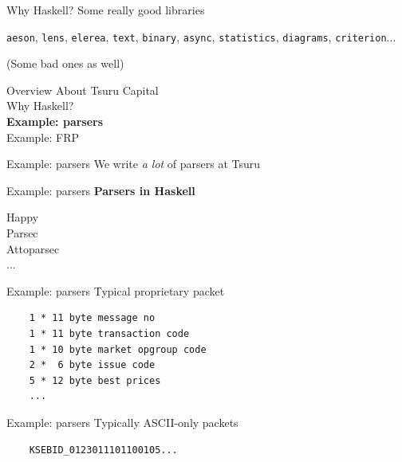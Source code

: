 \documentclass[20pt]{beamer}
\newcommand{\vspaced}{
    \vspace{5mm}
}
\begin{document}
\begin{frame}{Why Haskell?}
    Some really good libraries \\
    \vspaced
    \texttt{aeson}, \texttt{lens}, \texttt{elerea}, \texttt{text},
    \texttt{binary}, \texttt{async}, \texttt{statistics},
    \texttt{diagrams}, \texttt{criterion}...  \\
    \vspaced
    \small{(Some bad ones as well)}
\end{frame}


\begin{frame}{Overview}
    About Tsuru Capital \\
    Why Haskell? \\
    \textbf{Example: parsers} \\
    Example: FRP \\
\end{frame}

\begin{frame}{Example: parsers}
    We write \emph{a lot} of parsers at Tsuru
\end{frame}

\begin{frame}{Example: parsers}
    \textbf{Parsers in Haskell} \\
    \vspaced
    Happy \\
    Parsec \\
    Attoparsec \\
    ... \\
\end{frame}

\begin{frame}[fragile]{Example: parsers}
    Typical proprietary packet \\
    \vspaced
    \begin{lstlisting}
    1 * 11 byte message no
    1 * 11 byte transaction code
    1 * 10 byte market opgroup code
    2 *  6 byte issue code
    5 * 12 byte best prices
    ...
    \end{lstlisting}
\end{frame}

\begin{frame}[fragile]{Example: parsers}
    Typically ASCII-only packets
    \vspaced
    \begin{lstlisting}
    KSEBID_0123011101100105...
    \end{lstlisting}
\end{frame}
\end{document}
